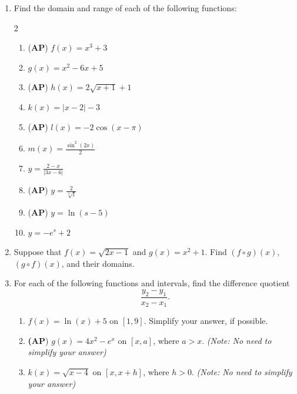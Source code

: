 \documentclass{article}
\newcommand{\vsp}{\vspace{1em}}
\newcommand{\<}{\langle}
\renewcommand{\>}{\rangle}
\begin{document}
\begin{enumerate}
   \item Find the domain and range of each of the following functions:
    \begin{multicols}{2}
    \begin{enumerate}
        \item (\textbf{AP}) $f(x)=x^3+3$  \medskip
        \item $g(x)=x^2 - 6x + 5$ \medskip
        \item (\textbf{AP}) $h(x)=2\sqrt{x+1}+1$ \medskip
        \item $k(x)=|x-2|-3$ \medskip
        \item (\textbf{AP}) $l(x)=-2\cos(x-\pi)$ \medskip
        \item $\displaystyle m(x)=\frac{\sin^2(2x)}{2}$ \medskip
        \item $\displaystyle y=\frac{2-x}{|3x-6|}$ \medskip
        \item (\textbf{AP}) $\displaystyle y=\frac{2}{\sqrt[4]{t}}$ \medskip
        \item (\textbf{AP}) $y=\ln(s-5)$ \medskip
        \item $y= -e^s+2$ 
    \end{enumerate}
    \end{multicols}\vsp 

\item Suppose that $f(x)=\sqrt{2x-1}$ and $g(x)=x^2+1$. Find $(f\circ g)(x)$, $(g \circ f)(x)$, and their domains. \vsp 
    \item For each of the following functions and intervals, find the difference quotient $$\frac{y_2-y_1}{x_2-x_1}.$$
    \begin{enumerate}
        \item $f(x) = \ln(x)+5$ on $[1,9]$. Simplify your answer, if possible. \medskip
        \item \textbf(\textbf{AP}) $g(x) = 4x^2-e^x$ on $[x,a]$, where $a > x$. \qquad \textit{(Note: No need to simplify your answer)} \medskip
        \item $k(x) = \sqrt{x-4}$ on $[x,x+h]$, where $h > 0$. \qquad \textit{(Note: No need to simplify your answer)} \medskip
    \end{enumerate}\vsp 


\end{enumerate}
\end{document}
